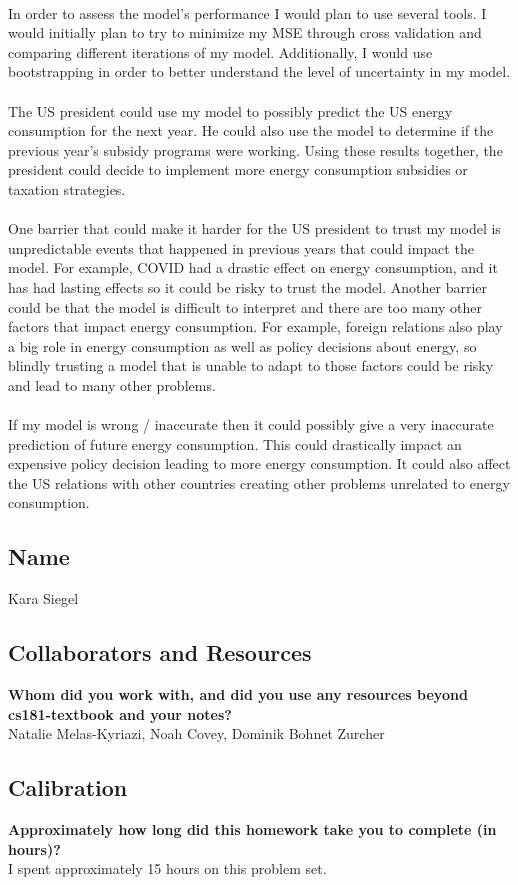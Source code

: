 \documentclass[submit]{harvardml}
\begin{document}
\\
In order to assess the model's performance I would plan to use several tools. I would initially plan to try to minimize my MSE through cross validation and comparing different iterations of my model. Additionally, I would use bootstrapping in order to better understand the level of uncertainty in my model. \\
\\
The US president could use my model to possibly predict the US energy consumption for the next year. He could also use the model to determine if the previous year's subsidy programs were working. Using these results together, the president could decide to implement more energy consumption subsidies or taxation strategies.\\
\\
One barrier that could make it harder for the US president to trust my model is unpredictable events that happened in previous years that could impact the model. For example, COVID had a drastic effect on energy consumption, and it has had lasting effects so it could be risky to trust the model. Another barrier could be that the model is difficult to interpret and there are too many other factors that impact energy consumption. For example, foreign relations also play a big role in energy consumption as well as policy decisions about energy, so blindly trusting a model that is unable to adapt to those factors could be risky and lead to many other problems.\\
\\
If my model is wrong / inaccurate then it could possibly give a very inaccurate prediction of future energy consumption. This could drastically impact an expensive policy decision leading to more energy consumption. It could also affect the US relations with other countries creating other problems unrelated to energy consumption.


\newpage
\subsection*{Name} Kara Siegel

\subsection*{Collaborators and Resources}
\textbf{Whom did you work with, and did you use any resources beyond cs181-textbook and your notes?}\\
Natalie Melas-Kyriazi, Noah Covey, Dominik Bohnet Zurcher

\subsection*{Calibration}
\textbf{Approximately how long did this homework take you to complete (in hours)? }\\
I spent approximately 15 hours on this problem set.
\end{document}
